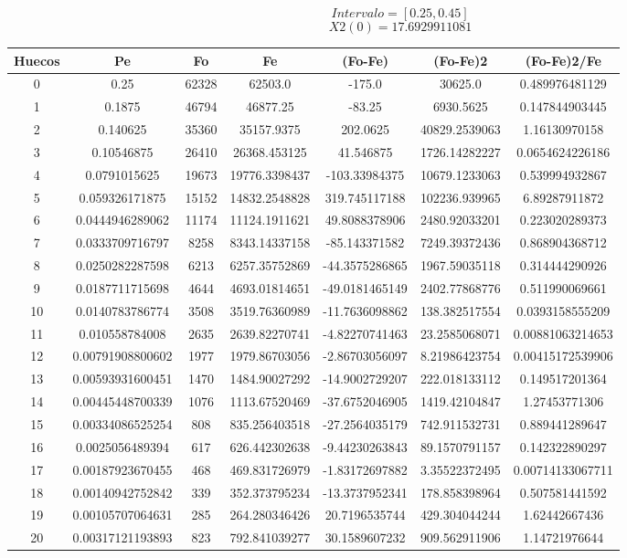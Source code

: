 \documentclass{article}
\begin{document}
$$
Intervalo = [0.25, 0.45]
$$
$$
X2(0) = 17.6929911081
$$
\begin{tabular}{|c|c|c|c|c|c|c|}
Huecos&Pe&Fo&Fe&(Fo{-}Fe)&(Fo{-}Fe)2&(Fo{-}Fe)2/Fe\\
\hline
0&0.25&62328&62503.0&{-}175.0&30625.0&0.489976481129\\
\hline
1&0.1875&46794&46877.25&{-}83.25&6930.5625&0.147844903445\\
\hline
2&0.140625&35360&35157.9375&202.0625&40829.2539063&1.16130970158\\
\hline
3&0.10546875&26410&26368.453125&41.546875&1726.14282227&0.0654624226186\\
\hline
4&0.0791015625&19673&19776.3398437&{-}103.33984375&10679.1233063&0.539994932867\\
\hline
5&0.059326171875&15152&14832.2548828&319.745117188&102236.939965&6.89287911872\\
\hline
6&0.0444946289062&11174&11124.1911621&49.8088378906&2480.92033201&0.223020289373\\
\hline
7&0.0333709716797&8258&8343.14337158&{-}85.143371582&7249.39372436&0.868904368712\\
\hline
8&0.0250282287598&6213&6257.35752869&{-}44.3575286865&1967.59035118&0.314444290926\\
\hline
9&0.0187711715698&4644&4693.01814651&{-}49.0181465149&2402.77868776&0.511990069661\\
\hline
10&0.0140783786774&3508&3519.76360989&{-}11.7636098862&138.382517554&0.0393158555209\\
\hline
11&0.010558784008&2635&2639.82270741&{-}4.82270741463&23.2585068071&0.00881063214653\\
\hline
12&0.00791908800602&1977&1979.86703056&{-}2.86703056097&8.21986423754&0.00415172539906\\
\hline
13&0.00593931600451&1470&1484.90027292&{-}14.9002729207&222.018133112&0.149517201364\\
\hline
14&0.00445448700339&1076&1113.67520469&{-}37.6752046905&1419.42104847&1.27453771306\\
\hline
15&0.00334086525254&808&835.256403518&{-}27.2564035179&742.911532731&0.889441289647\\
\hline
16&0.0025056489394&617&626.442302638&{-}9.44230263843&89.1570791157&0.142322890297\\
\hline
17&0.00187923670455&468&469.831726979&{-}1.83172697882&3.35522372495&0.00714133067711\\
\hline
18&0.00140942752842&339&352.373795234&{-}13.3737952341&178.858398964&0.507581441592\\
\hline
19&0.00105707064631&285&264.280346426&20.7196535744&429.304044244&1.62442667436\\
\hline
20&0.00317121193893&823&792.841039277&30.1589607232&909.562911906&1.14721976644\\
\end{tabular}
\end{document}
